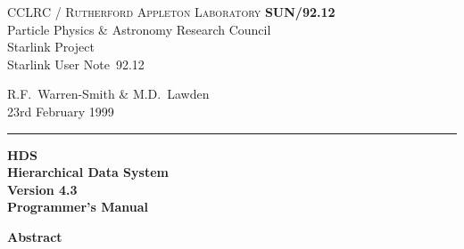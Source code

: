 \documentclass[twoside,11pt]{article}
\newcommand{\stardoccategory}  {Starlink User Note}
\newcommand{\stardocinitials}  {SUN}
\newcommand{\stardocnumber}    {92.12}
\newcommand{\stardocauthors}   {R.F.~Warren-Smith \& M.D.~Lawden}
\newcommand{\stardocdate}      {23rd February 1999}
\newcommand{\stardoctitle}     {HDS\\ [\latex{1ex}]
                                Hierarchical Data System}
\newcommand{\stardocversion}   {Version 4.3}
\newcommand{\stardocmanual}    {Programmer's Manual}
\newcommand{\stardocname}{\stardocinitials /\stardocnumber}
\newenvironment{latexonly}{}{}
\newcommand{\latex}[1]{#1}
\renewcommand{\_}{\texttt{\symbol{95}}}
\begin{document}
\thispagestyle{empty}

\begin{latexonly}
   CCLRC / \textsc{Rutherford Appleton Laboratory} \hfill \textbf{\stardocname}\\
   {\large Particle Physics \& Astronomy Research Council}\\
   {\large Starlink Project\\}
   {\large \stardoccategory\ \stardocnumber}
   \begin{flushright}
   \stardocauthors\\
   \stardocdate
   \end{flushright}
   \vspace{-4mm}
   \rule{\textwidth}{0.5mm}
   \vspace{5mm}
   \begin{center}
   {\Huge\textbf{\stardoctitle \\ [2.5ex]}}
   {\LARGE\textbf{\stardocversion \\ [4ex]}}
   {\Huge\textbf{\stardocmanual}}
   \end{center}
   \vspace{5mm}


   \vspace{10mm}
   \begin{center}
      {\Large\textbf{Abstract}}
   \end{center}
\end{latexonly}
\end{document}
